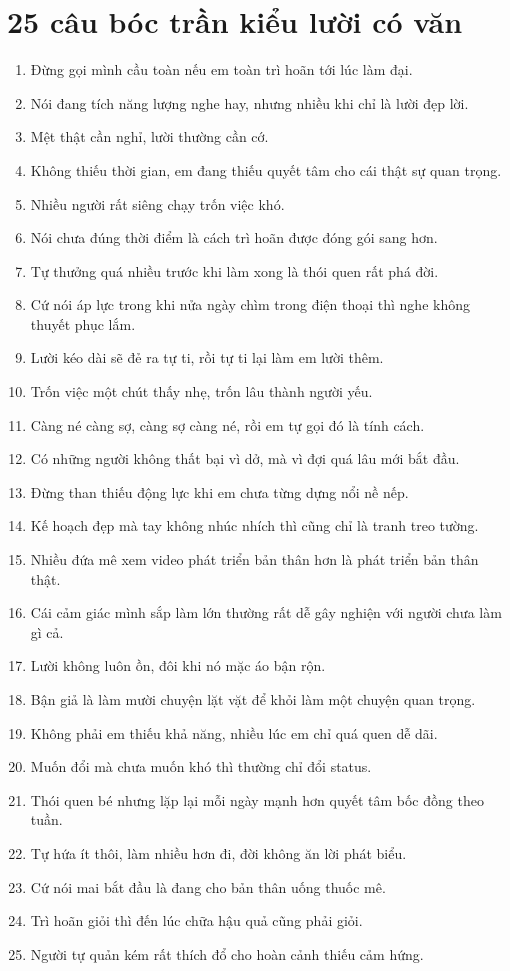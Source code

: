 \section{25 câu bóc trần kiểu lười có văn}
\begin{enumerate}[leftmargin=*]
\item Đừng gọi mình cầu toàn nếu em toàn trì hoãn tới lúc làm đại.
\item Nói đang tích năng lượng nghe hay, nhưng nhiều khi chỉ là lười đẹp lời.
\item Mệt thật cần nghỉ, lười thường cần cớ.
\item Không thiếu thời gian, em đang thiếu quyết tâm cho cái thật sự quan trọng.
\item Nhiều người rất siêng chạy trốn việc khó.
\item Nói chưa đúng thời điểm là cách trì hoãn được đóng gói sang hơn.
\item Tự thưởng quá nhiều trước khi làm xong là thói quen rất phá đời.
\item Cứ nói áp lực trong khi nửa ngày chìm trong điện thoại thì nghe không thuyết phục lắm.
\item Lười kéo dài sẽ đẻ ra tự ti, rồi tự ti lại làm em lười thêm.
\item Trốn việc một chút thấy nhẹ, trốn lâu thành người yếu.
\item Càng né càng sợ, càng sợ càng né, rồi em tự gọi đó là tính cách.
\item Có những người không thất bại vì dở, mà vì đợi quá lâu mới bắt đầu.
\item Đừng than thiếu động lực khi em chưa từng dựng nổi nề nếp.
\item Kế hoạch đẹp mà tay không nhúc nhích thì cũng chỉ là tranh treo tường.
\item Nhiều đứa mê xem video phát triển bản thân hơn là phát triển bản thân thật.
\item Cái cảm giác mình sắp làm lớn thường rất dễ gây nghiện với người chưa làm gì cả.
\item Lười không luôn ồn, đôi khi nó mặc áo bận rộn.
\item Bận giả là làm mười chuyện lặt vặt để khỏi làm một chuyện quan trọng.
\item Không phải em thiếu khả năng, nhiều lúc em chỉ quá quen dễ dãi.
\item Muốn đổi mà chưa muốn khó thì thường chỉ đổi status.
\item Thói quen bé nhưng lặp lại mỗi ngày mạnh hơn quyết tâm bốc đồng theo tuần.
\item Tự hứa ít thôi, làm nhiều hơn đi, đời không ăn lời phát biểu.
\item Cứ nói mai bắt đầu là đang cho bản thân uống thuốc mê.
\item Trì hoãn giỏi thì đến lúc chữa hậu quả cũng phải giỏi.
\item Người tự quản kém rất thích đổ cho hoàn cảnh thiếu cảm hứng.
\end{enumerate}


